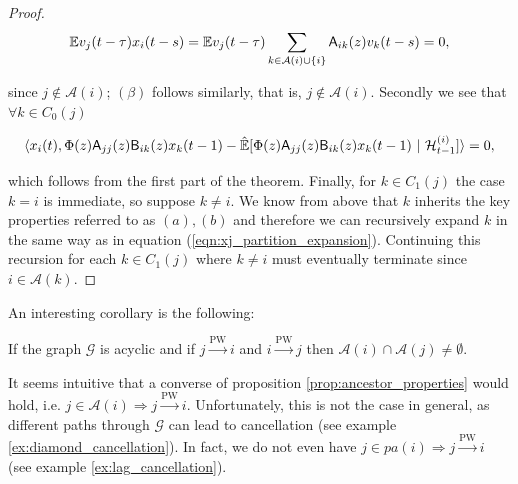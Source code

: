 \documentclass[12pt]{article}
\def\pwgc{\overset{\text{PW}}{\rightarrow}}  %
\def\gcg{\mathcal{G}}  %
\def\B{\mathsf{B}}  %
\def\A{\mathsf{A}}  %
\def\H{\mathcal{H}}  %
\newcommand{\linE}[2]{\hat{\E}[#1\ |\ #2]}  %
\newcommand{\pa}[1]{pa(#1)}  %
\newcommand{\anc}[1]{\mathcal{A}(#1)}  %
\begin{document}
\begin{proof}
  \begin{equation*}
    \E v_j(t - \tau) x_i(t - s) = \E v_j(t - \tau) \sum_{k \in \anc{i} \cup \{i\}}\A_{ik}(z)v_k(t - s) = 0,
  \end{equation*}

  since $j \not \in \anc{i}$; $(\beta)$ follows similarly, that is, $j \not \in \anc{i}$.  Secondly we see that $\forall k \in C_0(j)$

  \begin{equation*}
    \inner{x_i(t)}{\Phi(z)\A_{jj}(z)\B_{ik}(z)x_k(t - 1) - \linE{\Phi(z)\A_{jj}(z)\B_{ik}(z)x_k(t - 1)}{\H_{t - 1}^{(i)}}} = 0,
  \end{equation*}

  which follows from the first part of the theorem.  Finally, for $k \in C_1(j)$ the case $k = i$ is immediate, so suppose $k \ne i$.  We know from above that $k$ inherits the key properties referred to as $(a), (b)$ and therefore we can recursively expand $k$ in the same way as in equation (\ref{eqn:xj_partition_expansion}).  Continuing this recursion for each $k \in C_1(j)$ where $k \ne i$ must eventually terminate since $i \in \anc{k}$.
\end{proof}

An interesting corollary is the following:

\begin{corollary}
  If the graph $\gcg$ is acyclic and if $j \pwgc i$ and $i \pwgc j$ then $\anc{i} \cap \anc{j} \ne \emptyset$.
\end{corollary}

It seems intuitive that a converse of proposition \ref{prop:ancestor_properties}
would hold, i.e. $j \in \anc{i} \Rightarrow j \pwgc i$.  Unfortunately,
this is not the case in general, as different paths through $\gcg$ can
lead to cancellation (see example \ref{ex:diamond_cancellation}).  In
fact, we do not even have $j \in \pa{i} \Rightarrow j \pwgc i$ (see
example \ref{ex:lag_cancellation}).
\end{document}
